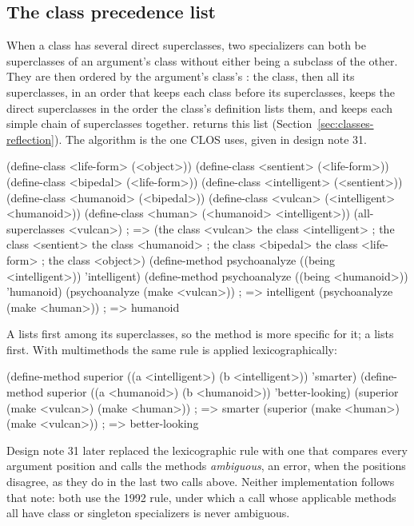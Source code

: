 \subsection{The class precedence list}\label{sec:functions-cpl}

When a class has several direct superclasses, two specializers can both be
superclasses of an argument's class without either being a subclass of the
other. They are then ordered by the argument's class's : the class, then all its superclasses, in an order that
keeps each class before its superclasses, keeps the direct superclasses in
the order the class's definition lists them, and keeps each simple chain of
superclasses together.  returns this list
(Section~\ref{sec:classes-reflection}). The algorithm is the one CLOS uses, given
in design note 31.

\begin{dylan}
(define-class <life-form> (<object>))
(define-class <sentient> (<life-form>))
(define-class <bipedal> (<life-form>))
(define-class <intelligent> (<sentient>))
(define-class <humanoid> (<bipedal>))
(define-class <vulcan> (<intelligent> <humanoid>))
(define-class <human> (<humanoid> <intelligent>))
(all-superclasses <vulcan>)
  ; => ({the class <vulcan>} {the class <intelligent>}
  ;     {the class <sentient>} {the class <humanoid>}
  ;     {the class <bipedal>} {the class <life-form>}
  ;     {the class <object>})
(define-method psychoanalyze ((being <intelligent>)) 'intelligent)
(define-method psychoanalyze ((being <humanoid>)) 'humanoid)
(psychoanalyze (make <vulcan>)) ; => intelligent
(psychoanalyze (make <human>))  ; => humanoid
\end{dylan}

\noindent A  lists  first among its
superclasses, so the  method is more specific for it; a
 lists  first. With multimethods the same
rule is applied lexicographically:

\begin{dylan}
(define-method superior ((a <intelligent>) (b <intelligent>)) 'smarter)
(define-method superior ((a <humanoid>) (b <humanoid>)) 'better-looking)
(superior (make <vulcan>) (make <human>))   ; => smarter
(superior (make <human>) (make <vulcan>))   ; => better-looking
\end{dylan}

\begin{notebox}
Design note 31 later replaced the lexicographic rule with one that compares
every argument position and calls the methods \emph{ambiguous}, an error,
when the positions disagree, as they do in the last two calls above. Neither
implementation follows that note: both use the 1992 rule, under which a call
whose applicable methods all have class or singleton specializers is never
ambiguous.
\end{notebox}

